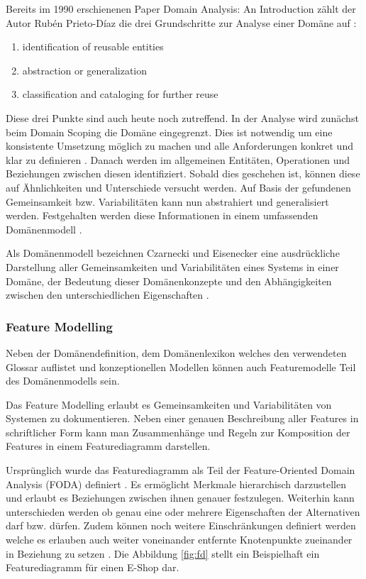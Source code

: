 \documentclass[12pt,oneside,a4paper,parskip]{scrbook}
\begin{document}
Bereits im 1990 erschienenen Paper Domain Analysis: An Introduction zählt der Autor Rubén Prieto-Díaz die drei Grundschritte zur Analyse einer Domäne auf \cite{prieto1990}:

\begin{enumerate}[itemsep=-10pt]
	\item identification of reusable entities 
	\item abstraction or generalization 
	\item classification and cataloging for further reuse
\end{enumerate}

Diese drei Punkte sind auch heute noch zutreffend. In der Analyse wird zunächst beim Domain Scoping die Domäne eingegrenzt. Dies ist notwendig um eine konsistente Umsetzung möglich zu machen und alle Anforderungen konkret und klar zu definieren \cite[S. 239]{stahl2007}. Danach werden im allgemeinen Entitäten, Operationen und Beziehungen zwischen diesen identifiziert. Sobald dies geschehen ist, können diese auf Ähnlichkeiten und Unterschiede versucht werden. Auf Basis der gefundenen Gemeinsamkeit bzw. Variabilitäten kann nun abstrahiert und generalisiert werden. Festgehalten werden diese Informationen in einem umfassenden Domänenmodell \cite[S. 24ff.]{czaeis2000}.

Als Domänenmodell bezeichnen Czarnecki und Eisenecker eine ausdrückliche Darstellung aller Gemeinsamkeiten und Variabilitäten eines Systems in einer Domäne, der Bedeutung dieser Domänenkonzepte und den Abhängigkeiten zwischen den unterschiedlichen Eigenschaften \cite[S. 23f.]{czaeis2000}.

\subsubsection{Feature Modelling}

Neben der Domänendefinition, dem Domänenlexikon welches den verwendeten Glossar auflistet und konzeptionellen Modellen können auch Featuremodelle Teil des Domänenmodells sein. 

Das Feature Modelling erlaubt es Gemeinsamkeiten und Variabilitäten von Systemen zu dokumentieren. Neben einer genauen Beschreibung aller Features in schriftlicher Form kann man Zusammenhänge und Regeln zur Komposition der Features in einem Featurediagramm darstellen.

Ursprünglich wurde das Featurediagramm als Teil der Feature-Oriented Domain Analysis (FODA) definiert \cite{kang1990}. Es ermöglicht Merkmale hierarchisch darzustellen und erlaubt es Beziehungen zwischen ihnen genauer festzulegen. Weiterhin kann unterschieden werden ob genau eine oder mehrere Eigenschaften der Alternativen darf bzw. dürfen. Zudem können noch weitere Einschränkungen definiert werden welche es erlauben auch weiter voneinander entfernte Knotenpunkte zueinander in Beziehung zu setzen \cite[S. 240f.]{stahl2007}. Die Abbildung \ref{fig:fd} stellt ein Beispielhaft ein Featurediagramm für einen E-Shop dar.
\end{document}
